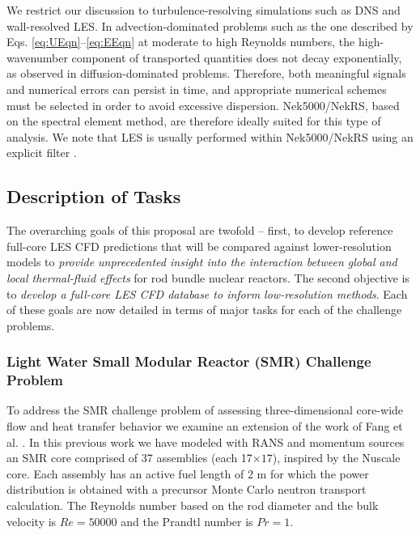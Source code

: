 We restrict our discussion to turbulence-resolving simulations such as DNS and
wall-resolved LES. In advection-dominated problems such as the
one described by Eqs. \ref{eq:UEqn}--\ref{eq:EEqn} at moderate to high Reynolds numbers,
the high-wavenumber component of transported quantities does not decay
exponentially, as observed in diffusion-dominated problems. Therefore, both
meaningful signals and numerical errors can persist in time, and appropriate
numerical schemes must be selected in order to avoid excessive dispersion.
Nek5000/NekRS, based on the spectral element method, are therefore ideally suited for this
type of analysis. We note that LES is usually performed within Nek5000/NekRS using an explicit filter \cite{schlatter21}.

\vspace{-.25in}
\subsection{Description of Tasks}
\label{sec:tasks}
\vspace{-.2in}


The overarching goals of this proposal are twofold -- first, to develop
reference full-core LES CFD predictions that will be compared against
lower-resolution models to {\it provide unprecedented insight into the interaction
between global and local thermal-fluid effects} for rod bundle nuclear reactors. The second
objective is to {\it develop a full-core LES CFD database to inform low-resolution methods}. Each of these
goals are now detailed in terms of major tasks for each of the challenge
problems.

\vspace{-.25in}
\subsubsection{Light Water Small Modular Reactor (SMR) Challenge Problem}
\vspace{-.2in}

To address the SMR challenge problem of assessing three-dimensional core-wide flow and heat transfer behavior we examine an extension of the work of Fang et al. \cite{Fang2021}.
In this previous work we have modeled with RANS and momentum sources an SMR core comprised of 37 assemblies (each 17$\times 17$), inspired by the Nuscale core. Each assembly has an active fuel length of $2$ m for which the power distribution is obtained with a precursor Monte Carlo neutron transport calculation. The Reynolds number based on the rod diameter and the bulk velocity is $Re=50000$ and the Prandtl number is $Pr=1$.

